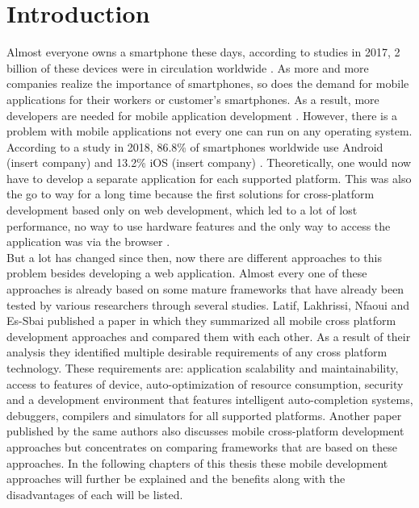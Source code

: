 \documentclass[Bachelor,BIF,english]{twbook}
\begin{document}
\chapter{Introduction}
Almost everyone owns a smartphone these days, according to studies in 2017, 2 billion of these devices were in circulation worldwide \cite[p.~184]{MartinezLecomte2017}. As more and more companies realize the importance of smartphones, so does the demand for mobile applications for their workers or customer's smartphones. As a result, more developers are needed for mobile application development \cite{GaouarBenamarBendimerad2016} \cite{Danielsson_2016}.
However, there is a problem with mobile applications not every one can run on any operating system. According to a study \cite{OSMarketShare} in 2018, 86.8\% of smartphones worldwide use Android (insert company) and 13.2\% iOS (insert company) \cite[p.~5]{Steczko2016}. Theoretically, one would now have to develop a separate application for each supported platform. This was also the go to way for a long time because the first solutions for cross-platform development based only on web development, which led to a lot of lost performance, no way to use hardware features and the only way to access the application was via the browser \cite[p.~626]{6420693} \cite[p.~1]{7934674}.
\\[\baselineskip]
But a lot has changed since then, now there are different approaches to this problem besides developing a web application. Almost every one of these approaches is already based on some mature frameworks that have already been tested by various researchers through several studies. Latif, Lakhrissi, Nfaoui and Es-Sbai published a paper \cite{7479278} in which they summarized all mobile cross platform development approaches and compared them with each other. As a result of their analysis they identified multiple desirable requirements of any cross platform technology. These requirements are: application scalability and maintainability, access to features of device, auto-optimization of resource consumption, security and a development environment that features intelligent auto-completion systems, debuggers, compilers and simulators for all supported platforms. Another paper \cite{7934674} published by the same authors also discusses mobile cross-platform development approaches but concentrates on comparing frameworks that are based on these approaches. In the following chapters of this thesis these mobile development approaches will further be explained and the benefits along with the disadvantages of each will be listed.
\end{document}
